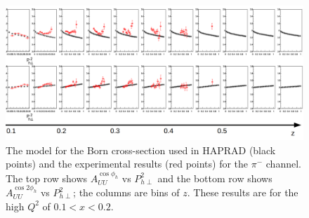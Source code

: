 %
\begin{figure}
\centering
\includegraphics[width=8.5in]{figures/hapradModel_data_compare_pim.pdf}
\caption{The model for the Born cross-section used in HAPRAD (black points) and the experimental results (red points) for the $\pi^-$ channel. The top row shows $A_{UU}^{\cos \phi_h}$ vs $P_{h\perp}^2$ and the bottom row shows $A_{UU}^{\cos 2\phi_h}$ vs $P_{h\perp}^2$; the columns are bins of $z$. These results are for the high $Q^2$ of $ 0.1 < x < 0.2$.}
\label{fig:hapradModel_data_compare_pim}
\end{figure}
%

